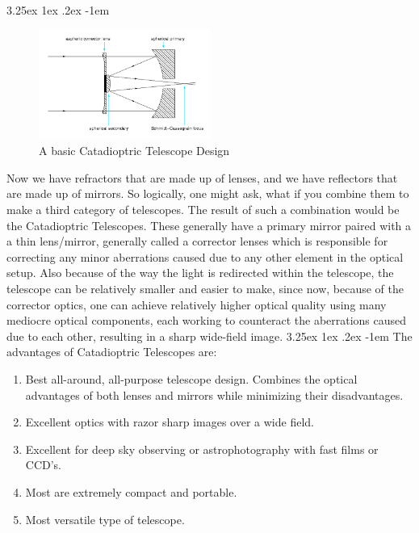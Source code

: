\documentclass[a4paper,twoside,11pt]{article}
\makeatletter
\numberwithin{equation}{section}
\renewcommand\paragraph{\@startsection{paragraph}{5}{\z@}%
  {3.25ex \@plus1ex \@minus.2ex}%
  {-1em}%
  {\normalfont\normalsize\bfseries}}
\makeatother
\begin{document}
\paragraph{}
\begin{figure}[h]
\centering
\includegraphics[width=0.5\textwidth]{fig27.jpg}
\caption{A basic Catadioptric Telescope Design}
\label{fig27}
\end{figure}
Now we have refractors that are made up of lenses, and we have reflectors that are made up of mirrors. So logically, one might ask, what if you combine them to make a third category of telescopes. The result of such a combination would be the Catadioptric Telescopes. These generally have a primary mirror paired with a a thin lens/mirror, generally called a corrector lenses which is responsible for correcting any minor aberrations caused due to any other element in the optical setup. Also because of the way the light is redirected within the telescope, the telescope can be relatively smaller and easier to make, since now, because of the corrector optics, one can achieve relatively higher optical quality using many mediocre optical components, each working to counteract the aberrations caused due to each other, resulting in a sharp wide-field image. 
\paragraph{}
The advantages of Catadioptric Telescopes are:
\begin{enumerate}
    \item Best all-around, all-purpose telescope design. Combines the optical advantages of both lenses and mirrors while minimizing their disadvantages.
    \item Excellent optics with razor sharp images over a wide field.
    \item Excellent for deep sky observing or astrophotography with fast films or CCD's.
    \item Most are extremely compact and portable. 
    \item Most versatile type of telescope. 
\end{enumerate}
\end{document}
